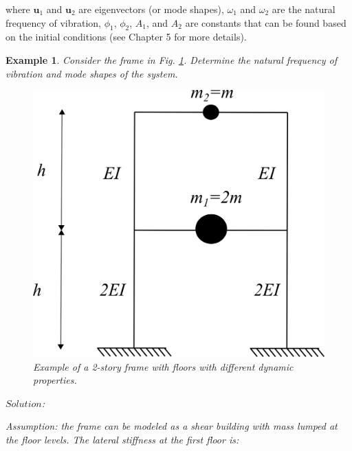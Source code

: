 \documentclass[12pt,letter]{article}
\newtheorem{ex}{Example}
\numberwithin{ex}{section} %
\newenvironment{example}{\begin{mdframed}[middlelinewidth=0.5mm]\begin{ex}\normalfont}{\end{ex}\end{mdframed}}
\numberwithin{re}{section} %
\begin{document}
\noindent where $\mathbf{u}_1$ and  $\mathbf{u}_2$ are eigenvectors (or mode shapes), $\omega_1$ and $\omega_2$ are the natural frequency of vibration, 
$\phi_1$, $\phi_2$, $A_1$, and $A_2$ are constants that can be found based on the initial conditions (see Chapter 5 for more details).

\vspace{4ex}

		
\begin{example}

Consider the frame in Fig. \ref{fig:two_story_frame_ex}. Determine the natural frequency of vibration and mode shapes of the system.

\begin{figure}[H]
	\centering
	\includegraphics{../figures/two_story_frame_example.png}
	\caption{Example of a 2-story frame with floors with different dynamic properties.}
	\label{fig:two_story_frame_ex}
\end{figure}




\noindent $Solution$:

\vspace{1ex}
	
Assumption: the frame can be modeled as a shear building with mass lumped at the floor levels. The lateral stiffness at the first floor is:


\end{example}
\end{document}
